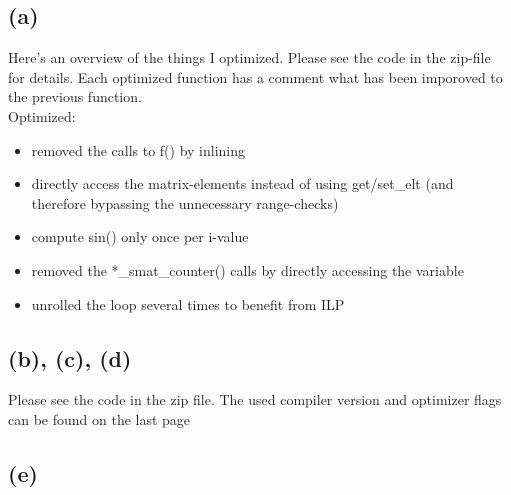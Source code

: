 \documentclass[10pt,a4paper,oneside,notitlepage]{report}
\begin{document}
\subsection*{(a)}
Here's an overview of the things I optimized. Please see the code in the zip-file for details.
Each optimized function has a comment what has been imporoved to the previous function. \\
Optimized:
\begin{itemize}
\item removed the calls to f() by inlining
\item directly access the matrix-elements instead of using get/set\_elt (and therefore bypassing the unnecessary range-checks)
\item compute sin() only once per i-value
\item removed the *\_smat\_counter() calls by directly accessing the variable
\item unrolled the loop several times to benefit from ILP
\end{itemize}

\subsection*{(b), (c), (d)}
Please see the code in the zip file. The used compiler version and optimizer flags can be found on the last page

\subsection*{(e)}
\end{document}
